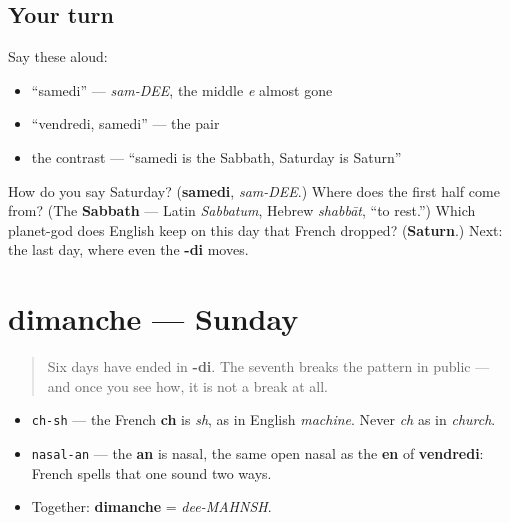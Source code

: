 \subsection*{Your turn}
Say these aloud:

\begin{itemize}
\raggedright
  \item \textquotedblleft{}samedi\textquotedblright{} — \emph{sam-DEE}, the middle \emph{e} almost gone
  \item \textquotedblleft{}vendredi, samedi\textquotedblright{} — the pair
  \item the contrast — \textquotedblleft{}samedi is the Sabbath, Saturday is Saturn\textquotedblright{}
\end{itemize}

\begin{tcolorbox}[breakable,colback=teal!4,colframe=teal!35!black,title={Before you move on}]
How do you say Saturday? (\textbf{samedi}, \emph{sam-DEE}.) Where does the first half come from? (The \textbf{Sabbath} — Latin \emph{Sabbatum}, Hebrew \emph{shabbāt}, \textquotedblleft{}to rest.\textquotedblright{}) Which planet-god does English keep on this day that French dropped? (\textbf{Saturn}.) Next: the last day, where even the \textbf{-di} moves.
\end{tcolorbox}
\section[dimanche]{dimanche — Sunday}

\label{lesson:FR-C07-dimanche}



\begin{quote}
Six days have ended in \textbf{-di}. The seventh breaks the pattern in public — and once you see how, it is not a break at all.
\end{quote}

\begin{sounds}
\begin{itemize}
\raggedright
  \item \texttt{ch-sh} — the French \textbf{ch} is \emph{sh}, as in English \emph{machine}. Never \emph{ch} as in \emph{church}.
  \item \texttt{nasal-an} — the \textbf{an} is nasal, the same open nasal as the \textbf{en} of \textbf{vendredi}: French spells that one sound two ways.
  \item Together: \textbf{dimanche} = \emph{dee-MAHNSH}.
\end{itemize}
\end{sounds}

